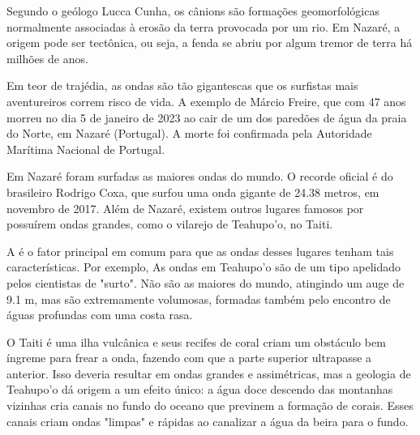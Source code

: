 \documentclass[book, 12pt, twoside, a5paper, english, brazil, sumario=tradicional, openany]{abntex2}
\begin{document}
Segundo o geólogo Lucca Cunha, os cânions são formações geomorfológicas normalmente associadas à erosão da terra provocada por um rio. Em Nazaré, a origem pode ser tectônica, ou seja, a fenda se abriu por algum tremor de terra há milhões de anos.

Em teor de trajédia, as ondas são tão gigantescas que os surfistas mais aventureiros correm risco de vida. A exemplo de Márcio Freire, que com 47 anos morreu no dia 5 de janeiro de 2023 ao cair de um dos paredões de água da praia do Norte, em Nazaré (Portugal). A morte foi confirmada pela Autoridade Marítima Nacional de Portugal.

{}

\vspace{-0.5cm}

Em Nazaré foram surfadas as maiores ondas do mundo. O recorde oficial é do brasileiro Rodrigo Coxa, que surfou uma onda gigante de 24.38 metros, em novembro de 2017. Além de Nazaré, existem outros lugares famosos por possuírem ondas grandes, como o vilarejo de Teahupo'o, no Taiti.

A {\color{celestialblue}{geologia}} é o fator principal em comum para que as ondas desses lugares tenham tais características. Por exemplo, As ondas em Teahupo'o são de um tipo apelidado pelos cientistas de "surto". Não são as maiores do mundo, atingindo um auge de 9.1 m, mas são extremamente volumosas, formadas também pelo encontro de águas profundas com uma costa rasa.

O Taiti é uma ilha vulcânica e seus recifes de coral criam um obstáculo bem íngreme para frear a onda, fazendo com que a parte superior ultrapasse a anterior. Isso deveria resultar em ondas grandes e assimétricas, mas a geologia de Teahupo'o dá origem a um efeito único: a água doce descendo das montanhas vizinhas cria canais no fundo do oceano que previnem a formação de corais. Esses canais criam ondas "limpas" e rápidas ao canalizar a água da beira para o fundo.

{}

\vspace{-0.3cm}
\end{document}
